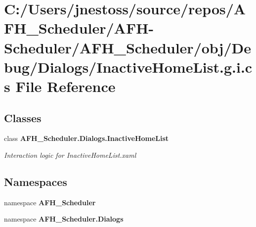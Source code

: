 \section{C\+:/\+Users/jnestoss/source/repos/\+A\+F\+H\+\_\+\+Scheduler/\+A\+F\+H-\/\+Scheduler/\+A\+F\+H\+\_\+\+Scheduler/obj/\+Debug/\+Dialogs/\+Inactive\+Home\+List.g.\+i.\+cs File Reference}
\label{_inactive_home_list_8g_8i_8cs}
\subsection*{Classes}
\begin{DoxyCompactItemize}
\item 
class \textbf{ A\+F\+H\+\_\+\+Scheduler.\+Dialogs.\+Inactive\+Home\+List}
\begin{DoxyCompactList}\small\item\em Interaction logic for Inactive\+Home\+List.\+xaml \end{DoxyCompactList}\end{DoxyCompactItemize}
\subsection*{Namespaces}
\begin{DoxyCompactItemize}
\item 
namespace \textbf{ A\+F\+H\+\_\+\+Scheduler}
\item 
namespace \textbf{ A\+F\+H\+\_\+\+Scheduler.\+Dialogs}
\end{DoxyCompactItemize}
